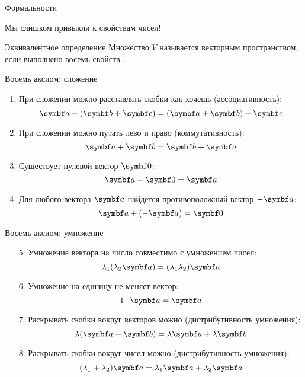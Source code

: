\begin{frame}{Формальности}

Мы слишком привыкли к свойствам чисел!

\pause

\vspace{40pt}

\begin{block}{Эквивалентное определение}
Множество $V$ называется \alert{векторным пространством}, если выполнено восемь свойств\ldots
\end{block}

\end{frame}

\begin{frame}{Восемь аксиом: сложение}
\begin{enumerate}
    \item При сложении можно расставлять скобки как хочешь (\alert{ассоциативность}):
    \[
    \ba + (\bb + \bc) = (\ba + \bb) + \bc    
    \]
    \item При сложении можно путать лево и право (\alert{коммутативность}):
    \[
    \ba + \bb = \bb + \ba    
    \]
    \item  Существует \alert{нулевой} вектор $\bzero$:
    \[
    \ba + \bzero = \ba    
    \]
    \item Для любого вектора $\ba$ найдется \alert{противоположный} вектор $-\ba$:
    \[
    \ba + (-\ba) = \bzero    
    \]
\end{enumerate}

\end{frame}


\begin{frame}{Восемь аксиом: умножение}
\begin{enumerate}[resume]
    \item[5.] Умножение вектора на число \alert{совместимо} с умножением чисел:
    \[
    \lambda_1 (\lambda_2\ba) = (\lambda_1 \lambda_2 ) \ba
    \]
    \item[6.]  Умножение на \alert{единицу} не меняет вектор:
    \[
    1\cdot \ba= \ba
    \]
    \item[7.] Раскрывать скобки вокруг векторов можно (\alert{дистрибутивность умножения}):
    \[
    \lambda (\ba + \bb) = \lambda \ba + \lambda \bb
    \]
    \item[8.] Раскрывать скобки вокруг чисел можно (\alert{дистрибутивность умножения}):
    \[
    (\lambda_1 + \lambda_2) \ba = \lambda_1 \ba + \lambda_2 \ba
    \]
\end{enumerate}

\end{frame}